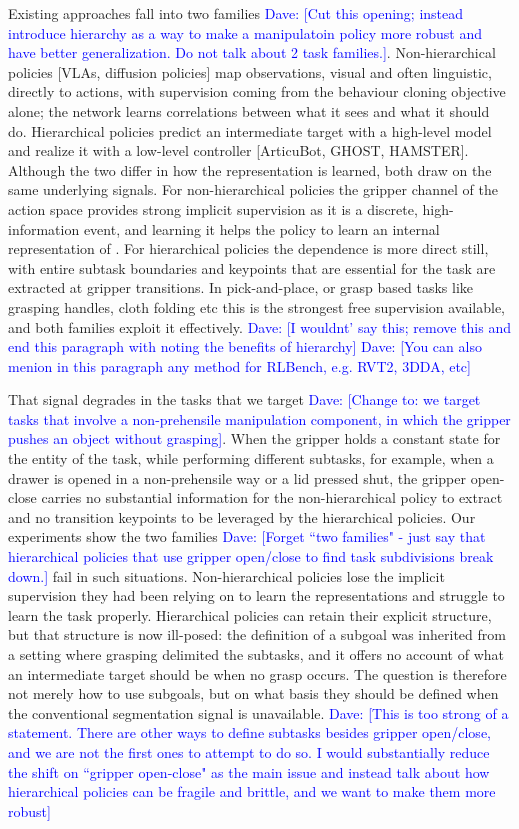 \documentclass[letterpaper, 10 pt, conference]{ieeeconf}  %
\newcommand{\dave}[1]{\textcolor{blue}{Dave: [#1]}} %
\begin{document}
Existing approaches fall into two families \dave{Cut this opening; instead introduce hierarchy as a way to make a manipulatoin policy more robust and have better generalization.  Do not talk about 2 task families.}. Non-hierarchical policies [VLAs, diffusion policies] map observations, visual and often linguistic, directly to actions, with supervision coming from the behaviour cloning objective alone; the network learns correlations between what it sees and what it should do.  Hierarchical policies predict an intermediate target with a high-level model and realize it with a low-level controller [ArticuBot, GHOST, HAMSTER]. Although the two differ in how the representation is learned, both draw on the same underlying signals. For non-hierarchical policies the gripper channel of the action space provides strong implicit supervision as it is a discrete, high-information event, and learning it helps the policy to learn an internal representation of . For hierarchical policies the dependence is more direct still, with entire subtask boundaries and keypoints that are essential for the task are extracted at gripper transitions. In pick-and-place, or grasp based tasks like grasping handles, cloth folding etc this is the strongest free supervision available, and both families exploit it effectively. \dave{I wouldnt' say this; remove this and end this paragraph with noting the benefits of hierarchy} \dave{You can also menion in this paragraph any method for RLBench, e.g. RVT2, 3DDA, etc}

That signal degrades in the tasks that we target \dave{Change to: we target tasks that involve a non-prehensile manipulation component, in which the gripper pushes an object without grasping}. When the gripper holds a constant state for the entity of the task, while performing different subtasks, for example, when a drawer is opened in a non-prehensile way or a lid pressed shut, the gripper open-close carries no substantial information for the non-hierarchical policy to extract and no transition keypoints to be leveraged by the hierarchical policies. Our experiments show the two families \dave{Forget ``two families" - just say that hierarchical policies that use gripper open/close to find task subdivisions break down.} fail in such situations. Non-hierarchical policies lose the implicit supervision they had been relying on to learn the representations and struggle to learn the task properly. Hierarchical policies can retain their explicit structure, but that structure is now ill-posed: the definition of a subgoal was inherited from a setting where grasping delimited the subtasks, and it offers no account of what an intermediate target should be when no grasp occurs. The question is therefore not merely how to use subgoals, but on what basis they should be defined when the conventional segmentation signal is unavailable. \dave{This is too strong of a statement.  There are other ways to define subtasks besides gripper open/close, and we are not the first ones to attempt to do so.  I would substantially reduce the shift on ``gripper open-close" as the main issue and instead talk about how hierarchical policies can be fragile and brittle, and we want to make them more robust}
\end{document}
